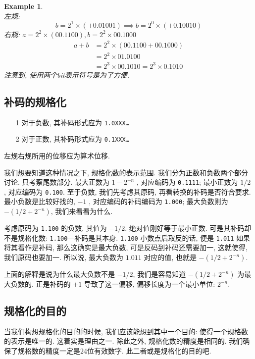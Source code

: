 \documentclass[12pt]{ctexart}
\theoremstyle{definition}
\theoremstyle{plain}
\newtheorem{exam}[definition]{Example}
\begin{document}
\begin{exam}\quad\\ 
左规:
\[
b = 2 ^{1} \times (+ 0.01001) \implies b = 2 ^{0} \times (+ 0.1 0010)
\]
右规: \(a = 2^{2} \times (00.1100) , b = 2^{2	} \times 00.1000\)
\[
\begin{aligned}
a + b & = 2 ^{2} \times ( 00. 1100 + 00.1000) \\ 
& =  2^{2} \times 01.0100 \\ 
&  = 2 ^{3} \times 00.1010 = 2 ^{3} \times 0.1010
\end{aligned}
\]
注意到, 使用两个bit表示符号是为了方便. 
\end{exam}

\subsection{补码的规格化}
\begin{itemize}
\item [1] 对于负数, 其补码形式应为 \texttt{1.0XXX\dots} 
\item [2] 对于正数, 其补码形式应为 \texttt{0.1XXX\dots}
\end{itemize}
左规右规所用的位移应为算术位移.

我们想要知道这种情况之下, 规格化数的表示范围. 我们分为正数和负数两个部分讨论. 只考察尾数部分. 
最大正数为 \(1 - 2 ^{-n}\) , 对应编码为 \texttt{0.1111}; 最小正数为 \(1/2\) , 对应编码为 \texttt{0.100}. 至于负数, 我们先考虑其原码, 再看转换的补码是否符合要求. 最小负数是比较好找的, \(-1\) , 对应编码的补码编码为 \texttt{1.000}; 最大负数则为 \(- (1/2 + 2 ^{-n})\), 我们来看看为什么. 

考虑原码为 \texttt{1.100} 的负数, 其值为 \(-1/2\), 绝对值刚好等于最小正数. 可是其补码却不是规格化数: \texttt{1.100}---补码是其本身. \texttt{1.100} 小数点后取反的话, 便是 \texttt{1.011} 如果将其看作是补码, 那么这确实是最大负数, 可是反码到补码还需要加一, 这就使得, 我们原码也要加一. 所以说, 最大负数为 \(1.011\) 对应的值, 也就是 \(-(1/2 + 2^{-n})\). 

上面的解释是说为什么最大负数不是 \(-1/2\), 我们是容易知道 \(-(1/2 + 2 ^{-n})\) 为最大负数的. 正是补码的 \(+1\) 导致了这一偏移, 偏移长度为一个最小单位: \(2 ^{-n}\). 
\subsection{规格化的目的}
当我们构想规格化的目的的时候, 我们应该能想到其中一个目的: 使得一个规格数的表示是唯一的. 这着实是理由之一. 除此之外, 规格化数的精度是相同的. 我们确保了规格数的精度一定是24位有效数字. 此二者或是规格化的目的吧. 
\end{document}
